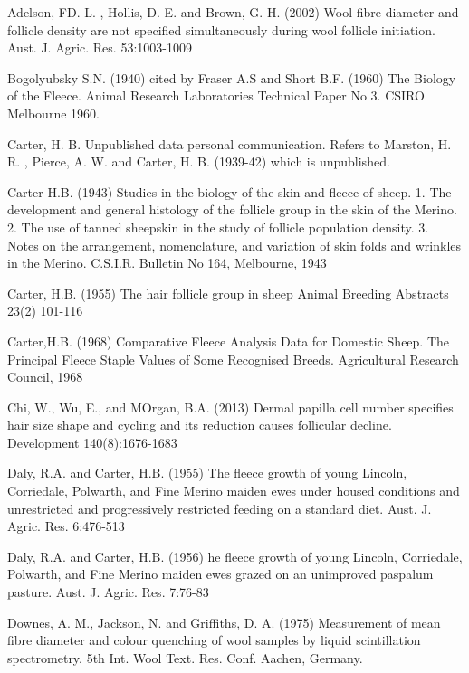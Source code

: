 \documentclass[titlepage]{article}  %
\begin{document}
\clearpage
\begin{thebibliography}{}

Adelson, FD. L. , Hollis, D. E. and Brown, G. H. (2002) Wool fibre diameter and follicle density are not specified simultaneously during wool follicle initiation. Aust. J. Agric. Res. 53:1003-1009

 Bogolyubsky S.N. (1940) cited by Fraser A.S and Short B.F. (1960) The Biology of the Fleece. Animal Research Laboratories Technical Paper No 3. CSIRO Melbourne 1960.

Carter, H. B. Unpublished data personal communication. Refers to Marston, H. R. , Pierce, A. W. and Carter, H. B. (1939-42) which is unpublished.

Carter H.B. (1943) Studies in the biology of the skin and fleece of sheep. 1. The development and general histology of the follicle group in the skin of the Merino. 2. The use of tanned sheepskin in the study of follicle population density. 3. Notes on the arrangement, nomenclature, and variation of skin folds and wrinkles in the Merino. C.S.I.R. Bulletin No 164, Melbourne, 1943

Carter, H.B. (1955) The hair follicle group in sheep Animal Breeding Abstracts 23(2) 101-116

Carter,H.B. (1968) Comparative Fleece Analysis Data for Domestic Sheep. The Principal Fleece Staple Values of Some Recognised Breeds. Agricultural Research Council, 1968

Chi, W., Wu, E., and MOrgan, B.A. (2013) Dermal papilla cell number specifies hair size shape and cycling and its reduction causes follicular decline. Development 140(8):1676-1683

Daly, R.A. and Carter, H.B. (1955) The fleece growth of young Lincoln, Corriedale, Polwarth, and Fine Merino maiden ewes under housed conditions and unrestricted and progressively restricted feeding on a standard diet. Aust. J. Agric. Res. 6:476-513

Daly, R.A. and Carter, H.B. (1956) he fleece growth of young Lincoln, Corriedale, Polwarth, and Fine Merino maiden ewes grazed on an unimproved paspalum pasture. Aust. J. Agric. Res. 7:76-83

Downes, A. M., Jackson, N. and Griffiths, D. A. (1975) Measurement of mean fibre diameter and colour quenching of wool samples by liquid scintillation spectrometry. 5th Int. Wool Text. Res. Conf. Aachen, Germany.


\end{thebibliography}
\end{document}
